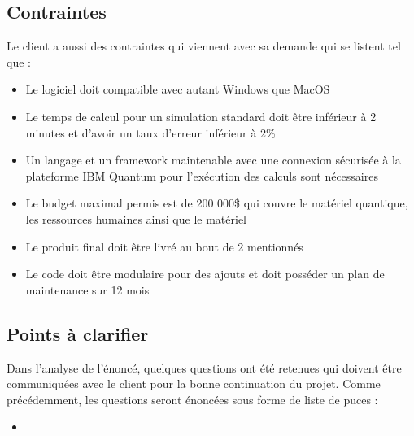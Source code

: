 \documentclass[11pt]{article}
\begin{document}
\subsection{Contraintes}
Le client a aussi des contraintes qui viennent avec sa demande qui se listent tel que :

\begin{itemize}
  \item Le logiciel doit compatible avec autant Windows que MacOS
  \item Le temps de calcul pour un simulation standard doit être inférieur à 2 minutes et d'avoir un taux d'erreur inférieur à 2\%
  \item Un langage et un framework maintenable avec une connexion sécurisée à la plateforme IBM Quantum pour l’exécution des calculs sont nécessaires
  \item Le budget maximal permis est de 200 000\$ qui couvre le matériel quantique, les ressources humaines ainsi que le matériel
  \item Le produit final doit être livré au bout de 2 mentionnés
  \item Le code doit être modulaire pour des ajouts et doit posséder un plan de maintenance sur 12 mois
\end{itemize}

\subsection{Points à clarifier}
Dans l'analyse de l'énoncé, quelques questions ont été retenues qui doivent être communiquées avec le client pour la bonne continuation du projet. Comme précédemment, les questions seront énoncées sous forme de liste de puces :

\begin{itemize}
  \item 
\end{itemize}
\end{document}
